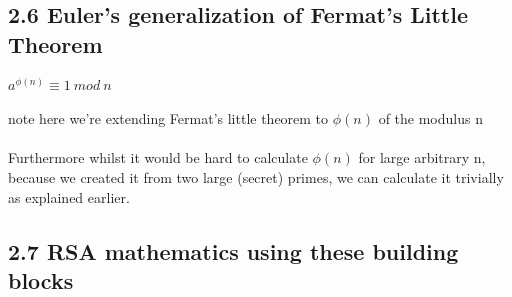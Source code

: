 \documentclass[11pt]{article}   	%
\begin{document}
\subsection*{2.6 Euler’s generalization of Fermat’s Little Theorem}

$ a^{\phi(n)} \equiv 1 \ mod \ n $ \\
\\
note here we're extending Fermat's little theorem to $ \phi(n) $ of the modulus n \\
\\
Furthermore whilst it would be hard to calculate $ \phi(n) $ for large arbitrary n, because we created it from two large (secret) primes, we can calculate it trivially as explained earlier.


\subsection*{2.7 RSA mathematics using these building blocks}
\end{document}
